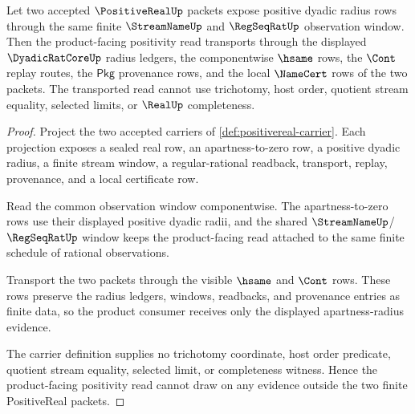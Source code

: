 \begin{theorem}
\label{thm:positivereal-multiplicative-radius-transport}
Let two accepted $\PositiveRealUp$ packets expose positive dyadic radius rows
through the same finite $\StreamNameUp$ and $\RegSeqRatUp$ observation window.
Then the product-facing positivity read transports through the displayed
$\DyadicRatCoreUp$ radius ledgers, the componentwise $\hsame$ rows, the
$\Cont$ replay routes, the $\mathsf{Pkg}$ provenance rows, and the local
$\NameCert$ rows of the two packets. The transported read cannot use
trichotomy, host order, quotient stream equality, selected limits, or
$\RealUp$ completeness.
\end{theorem}
\begin{proof}
Project the two accepted carriers of \autoref{def:positivereal-carrier}. Each
projection exposes a sealed real row, an apartness-to-zero row, a positive
dyadic radius, a finite stream window, a regular-rational readback, transport,
replay, provenance, and a local certificate row.

Read the common observation window componentwise. The apartness-to-zero rows
use their displayed positive dyadic radii, and the shared
$\StreamNameUp$/$\RegSeqRatUp$ window keeps the product-facing read attached to
the same finite schedule of rational observations.

Transport the two packets through the visible $\hsame$ and $\Cont$ rows. These
rows preserve the radius ledgers, windows, readbacks, and provenance entries as
finite data, so the product consumer receives only the displayed
apartness-radius evidence.

The carrier definition supplies no trichotomy coordinate, host order predicate,
quotient stream equality, selected limit, or completeness witness. Hence the
product-facing positivity read cannot draw on any evidence outside the two
finite PositiveReal packets.
\end{proof}

